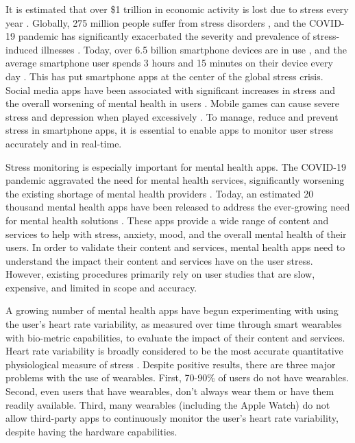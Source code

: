 \documentclass{article}
\begin{document}
It is estimated that over \$1 trillion in economic activity is lost due to stress every year \cite{WHO_GDPLossStress}. Globally, 275 million people suffer from stress disorders \cite{Fleming2019_StressDisorders}, and the COVID-19 pandemic has significantly exacerbated the severity and prevalence of stress-induced illnesses \cite{Cost22_CovidCanadaMentalHealth, GarcíaFernández22_SpainCovidHealthWorkers, RavensSieberer22_CovidGermany}. Today, over 6.5 billion smartphone devices are in use \cite{Turner22_Smartphones}, and the average smartphone user spends 3 hours and 15 minutes on their device every day \cite{Howarth22_SmartphoneUsage}. This has put smartphone apps at the center of the global stress crisis. Social media apps have been associated with significant increases in stress and the overall worsening of mental health in users \cite{McHugh18_SocialMediaTeens,Ngien22_SocialMediaPandemic}. Mobile games can cause severe stress and depression  when played excessively \cite{Wang19_GameMentalHealth}. To manage, reduce and prevent stress in smartphone apps, it is essential to enable apps to monitor user stress accurately and in real-time.

Stress monitoring is especially important for mental health apps. The COVID-19 pandemic aggravated the need for mental health services, significantly worsening the existing shortage of mental health providers \cite{Caron21_ProvidersStruggle}. Today, an estimated 20 thousand mental health apps have been released to address the ever-growing need for mental health solutions \cite{Auxier21_MentalHealthApps}. These apps provide a wide range of content and services to help with stress, anxiety, mood, and the overall mental health of their users. 
In order to validate their content and services, mental health apps need to understand the impact their content and services have on the user stress. However, existing procedures primarily rely on user studies that are slow, expensive, and limited in scope and accuracy.

A growing number of mental health apps have begun experimenting with using the user's heart rate variability, as measured over time through smart wearables with bio-metric capabilities, to evaluate the impact of their content and services. Heart rate variability is broadly considered to be the most accurate quantitative physiological measure of stress \cite{BaevskyStressIndex, Kim18_StressHRV}. Despite positive results, there are three major problems with the use of wearables. First, 70-90\% of users do not have wearables. Second, even users that have wearables, don’t always wear them or have them readily available. Third, many wearables (including the Apple Watch) do not allow third-party apps to continuously monitor the user’s heart rate variability, despite having the hardware capabilities.
\end{document}
